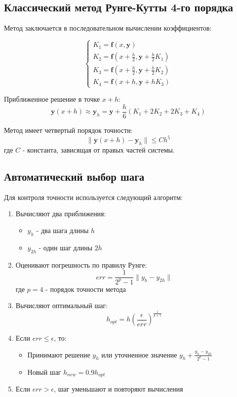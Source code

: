 \documentclass[a4paper, 14pt]{extarticle}
\begin{document}
\subsection{Классический метод Рунге-Кутты 4-го порядка}
Метод заключается в последовательном вычислении коэффициентов:

\[
\begin{cases}
K_1 = \mathbf{f}(x, \mathbf{y}) \\
K_2 = \mathbf{f}\left(x + \frac{h}{2}, \mathbf{y} + \frac{h}{2}K_1\right) \\
K_3 = \mathbf{f}\left(x + \frac{h}{2}, \mathbf{y} + \frac{h}{2}K_2\right) \\
K_4 = \mathbf{f}(x + h, \mathbf{y} + hK_3)
\end{cases}
\]

Приближенное решение в точке $x + h$:
\[
\mathbf{y}(x + h) \approx \mathbf{y}_h = \mathbf{y} + \frac{h}{6}(K_1 + 2K_2 + 2K_3 + K_4)
\]

Метод имеет четвертый порядок точности:
\[
\|\mathbf{y}(x + h) - \mathbf{y}_h\| \leq Ch^5
\]
где $C$ - константа, зависящая от правых частей системы.

\subsection{Автоматический выбор шага}
Для контроля точности используется следующий алгоритм:

\begin{enumerate}
\item Вычисляют два приближения:
\begin{itemize}
\item $y_h$ - два шага длины $h$
\item $y_{2h}$ - один шаг длины $2h$
\end{itemize}

\item Оценивают погрешность по правилу Рунге:
\[
err = \frac{1}{2^p - 1}\|y_h - y_{2h}\|
\]
где $p = 4$ - порядок точности метода

\item Вычисляют оптимальный шаг:
\[
h_{opt} = h\left(\frac{\epsilon}{err}\right)^{\frac{1}{p+1}}
\]

\item Если $err \leq \epsilon$, то:
\begin{itemize}
\item Принимают решение $y_h$ или уточненное значение $y_h + \frac{y_h - y_{2h}}{2^p - 1}$
\item Новый шаг $h_{new} = 0.9h_{opt}$
\end{itemize}

\item Если $err > \epsilon$, шаг уменьшают и повторяют вычисления
\end{enumerate}
\end{document}
